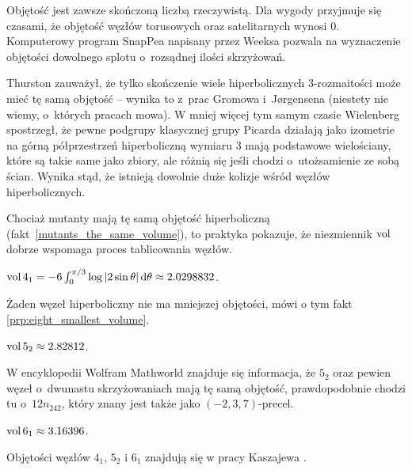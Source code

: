 Objętość jest zawsze skończoną liczbą rzeczywistą.
Dla wygody przyjmuje się czasami, że objętość węzłów torusowych oraz satelitarnych wynosi $0$.
Komputerowy program SnapPea napisany przez Weeksa pozwala na wyznaczenie objętości dowolnego splotu o~rozsądnej ilości skrzyżowań.

Thurston \cite[s. 365]{thurston1982} zauważył, że tylko skończenie wiele hiperbolicznych 3-rozmaitości może mieć tę samą objętość -- wynika to z~prac Gromowa i~Jørgensena (niestety nie wiemy, o~których pracach mowa).
%
W mniej więcej tym samym czasie Wielenberg \cite{wielenberg1981} spostrzegł, że pewne podgrupy klasycznej grupy Picarda działają jako izometrie na górną półprzestrzeń hiperboliczną wymiaru 3 mają podstawowe wielościany, które są takie same jako zbiory, ale różnią się jeśli chodzi o~utożsamienie ze sobą ścian.
%
%
Wynika stąd, że istnieją dowolnie duże kolizje wśród węzłów hiperbolicznych.

Chociaż mutanty mają tę samą objętość hiperboliczną (fakt~\ref{mutants_the_same_volume}), to praktyka pokazuje, że niezmiennik $\operatorname{vol}$ dobrze wspomaga proces tablicowania węzłów.
%

\begin{example}
    $\operatorname{vol} 4_1 = -6 \int_{0}^{\pi/3} \log |2\sin \theta| \,\mathrm{d}\theta \approx 2.0298832$.
\end{example}

Żaden węzeł hiperboliczny nie ma mniejszej objętości, mówi o tym fakt \ref{prp:eight_smallest_volume}.

\begin{example}
    $\operatorname{vol} 5_2 \approx 2.82812$.
\end{example}

W encyklopedii Wolfram Mathworld znajduje się informacja, że $5_2$ oraz pewien węzeł o~dwunastu skrzyżowaniach mają tę samą objętość, prawdopodobnie chodzi tu o~$12n_{242}$, który znany jest także jako $(-2, 3, 7)$-precel.
%
%

\begin{example}
    $\operatorname{vol} 6_1 \approx 3.16396$.
\end{example}

Objętości węzłów $4_1$, $5_2$ i $6_1$ znajdują się w pracy Kaszajewa \cite[s. 6]{kashaev1996}.
%

